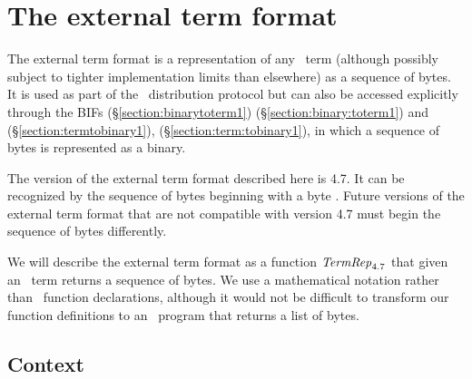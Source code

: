 %
%
%
%
%
%
%

\chapter{The external term format}

\label{chapter:external-format}

The external term format is a representation of any \Erlang\ term
\ifStd (although possibly subject to tighter implementation limits than elsewhere) \fi
as a sequence of bytes.  It is used as part of the \Erlang\
distribution protocol but can also be accessed explicitly through the
BIFs
\ifOld {}
(\S\ref{section:binarytoterm1}) \fi
\ifStd {}
(\S\ref{section:binary:toterm1}) \fi
and
\ifOld {}
(\S\ref{section:termtobinary1}),\fi
\ifStd {}
(\S\ref{section:term:tobinary1}),\fi
in which a sequence of bytes is represented as
a binary.

The version of the external term format described here is 4.7.  It can
be recognized by the sequence of bytes beginning with a byte \T{131}.
Future versions of the external term format that are not compatible
with version 4.7 must begin the sequence of bytes differently.

We will describe the external term format as a function
${\it TermRep}_{4.7}$ that given an \Erlang\ term returns a sequence of
bytes.  We use a mathematical notation rather than \Erlang\ function
declarations, although it would not be difficult to transform our
function definitions to an \Erlang\ program that returns a list of
bytes.

\section{Context}

